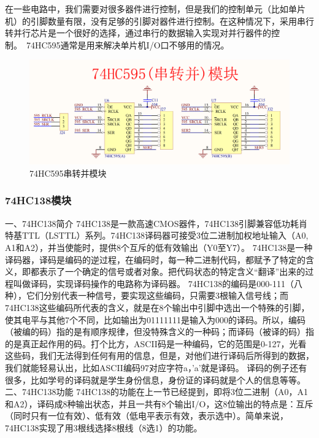 \documentclass{textreportclass}  %
\begin{document}
		
		在一些电路中，我们需要对很多器件进行控制，但是我们的控制单元（比如单片机）的引脚数量有限，没有足够的引脚对器件进行控制。在这种情况下，采用串行转并行芯片是一个很好的选择，通过串行的数据输入实现对并行器件的控制。 74HC595通常是用来解决单片机I/O口不够用的情况。
		
		\begin{figure}[htbp]
			\centering
			\includegraphics[scale=0.4]{Fig/74HC595串转并模块.png}
			\caption{74HC595串转并模块}\label{Fig.10}
		\end{figure}
		

	\subsubsection{74HC138模块}					%
	一、74HC138简介
	74HC138是一款高速CMOS器件，74HC138引脚兼容低功耗肖特基TTL（LSTTL）系列。74HC138译码器可接受3位二进制加权地址输入（A0, A1和A2），并当使能时，提供8个互斥的低有效输出（Y0至Y7）。
	74HC138是一种译码器，译码是编码的逆过程，在编码时，每一种二进制代码，都赋予了特定的含义，即都表示了一个确定的信号或者对象。把代码状态的特定含义“翻译”出来的过程叫做译码，实现译码操作的电路称为译码器。
	74HC138的编码是000-111（八种），它们分别代表一种信号，要实现这些编码，只需要3根输入信号线；而74HC138这些编码所代表的含义，就是在8个输出中引脚中选出一个特殊的引脚，使其电平与其他7个不同，比如输出为01111111是输入为000的译码。所以，编码（被编的码）指的是有顺序规律，但没特殊含义的一种码；而译码（被译的码）指的是真正起作用的码。打个比方，ASCII码是一种编码，它的范围是0-127，光看这些码，我们无法得到任何有用的信息，但是，对他们进行译码后所得到的数据，我们就能轻易认出，比如ASCII编码97对应字符a，’a’就是译码。
	译码的例子还有很多，比如学号的译码就是学生身份信息，身份证的译码就是个人的信息等等。
	二、74HC138功能
	74HC138的功能在上一节已经提到，即将3位二进制（A0，A1和A2），译码成8种输出状态，并且一共有8个输出I/O，这8位输出的特点是：互斥（同时只有一位有效）、低有效（低电平表示有效，表示选中）。简单来说，74HC138实现了用3根线选择8根线（8选1）的功能。
	
\end{document}
